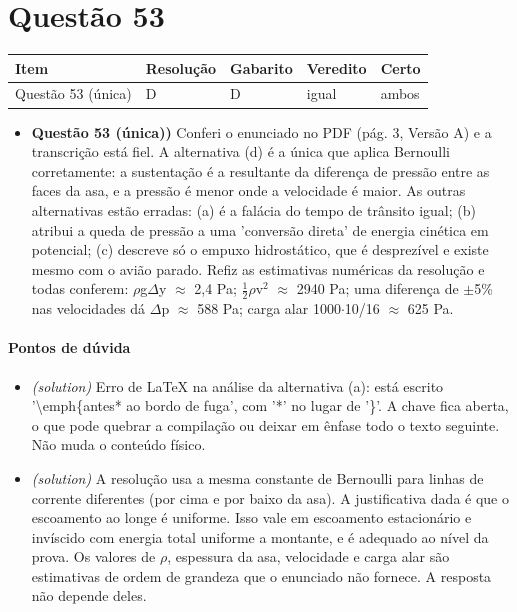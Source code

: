 \documentclass{article}%
\begin{document}
\section*{Questão 53}%
\begin{longtable}{@{}p{} p{} p{} p{} p{}@{}}\toprule Item & Resolução & Gabarito & Veredito & Certo \\ \midrule
Questão 53 (única) & D & D & igual & ambos \\
\bottomrule\end{longtable}%
\begin{itemize}%
\item%
\textbf{Questão 53 (única))} Conferi o enunciado no PDF (pág. 3, Versão A) e a transcrição está fiel. A alternativa (d) é a única que aplica Bernoulli corretamente: a sustentação é a resultante da diferença de pressão entre as faces da asa, e a pressão é menor onde a velocidade é maior. As outras alternativas estão erradas: (a) é a falácia do tempo de trânsito igual; (b) atribui a queda de pressão a uma 'conversão direta' de energia cinética em potencial; (c) descreve só o empuxo hidrostático, que é desprezível e existe mesmo com o avião parado. Refiz as estimativas numéricas da resolução e todas conferem: $\rho$g$\Delta$y $\approx$ 2,4 Pa; $\frac12$$\rho$v$^2$ $\approx$ 2940 Pa; uma diferença de $\pm$5\% nas velocidades dá $\Delta$p $\approx$ 588 Pa; carga alar 1000$\cdot$10/16 $\approx$ 625 Pa.%
\end{itemize}%
\paragraph{Pontos de dúvida}%
\begin{itemize}%
\item%
\textit{(solution)} Erro de LaTeX na análise da alternativa (a): está escrito '\textbackslash{}emph\{antes* ao bordo de fuga', com '*' no lugar de '\}'. A chave fica aberta, o que pode quebrar a compilação ou deixar em ênfase todo o texto seguinte. Não muda o conteúdo físico.%
\item%
\textit{(solution)} A resolução usa a mesma constante de Bernoulli para linhas de corrente diferentes (por cima e por baixo da asa). A justificativa dada é que o escoamento ao longe é uniforme. Isso vale em escoamento estacionário e invíscido com energia total uniforme a montante, e é adequado ao nível da prova. Os valores de $\rho$, espessura da asa, velocidade e carga alar são estimativas de ordem de grandeza que o enunciado não fornece. A resposta não depende deles.%
\end{itemize}%
\end{document}
